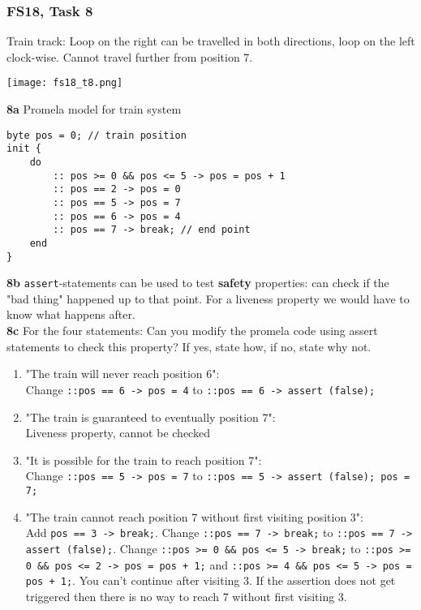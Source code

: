 \documentclass{article}
\begin{document}
\subsubsection{FS18, Task 8}
Train track: Loop on the right can be travelled in both directions, loop on the left clock-wise. Cannot travel further from position 7.
\begin{center}
    \texttt{[image: fs18\_t8.png]}
\end{center}
\textbf{8a} Promela model for train system
\begin{verbatim}
byte pos = 0; // train position
init {
    do
        :: pos >= 0 && pos <= 5 -> pos = pos + 1
        :: pos == 2 -> pos = 0
        :: pos == 5 -> pos = 7
        :: pos == 6 -> pos = 4
        :: pos == 7 -> break; // end point
    end
}
\end{verbatim} 
\textbf{8b} \texttt{assert}-statements can be used to test \textbf{safety} properties: can check if the "bad thing" happened up to that point. For a liveness property we would have to know what happens after. \smallskip \\
\textbf{8c} For the four statements: Can you modify the promela code using assert statements to check this property? If yes, state how, if no, state why not. 
\begin{enumerate}
    \item "The train will never reach position 6": \\
    Change \texttt{::pos == 6 -> pos = 4} to \texttt{::pos == 6 -> assert (false);}
    \item "The train is guaranteed to eventually position 7":\\
    Liveness property, cannot be checked 
    \item "It is possible for the train to reach position 7": \\
    Change \texttt{::pos == 5 -> pos = 7} to \texttt{::pos == 5 -> assert (false); pos = 7;}
    \item "The train cannot reach position 7 without first visiting position 3": \\
    Add \texttt{pos == 3 -> break;}. Change \texttt{::pos == 7 -> break;} to \texttt{::pos == 7 -> assert (false);}. Change \texttt{::pos >= 0 \&\& pos <= 5 -> break;} to \texttt{::pos >= 0 \&\& pos <= 2 -> pos = pos + 1;} and  \texttt{::pos >= 4 \&\& pos <= 5 -> pos = pos + 1;}. You can't continue after visiting 3. If the assertion does not get triggered then there is no way to reach 7 without first visiting 3.
    
\end{enumerate}
\end{document}
